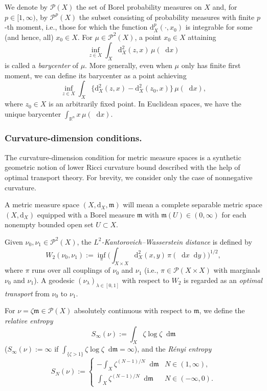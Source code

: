 \documentclass[sts]{imsart}
\theoremstyle{definition}
\theoremstyle{remark}
\newcommand{\R}{\mathbb{R}}
\newcommand{\fm}{\mathfrak{m}}
\newcommand{\dist}{\mathrm{d}}
\newcommand*\diff{\mathop{}\!\mathrm{d}}
\begin{document}
We denote by $\mathcal{P}(X)$ the set of Borel probability measures on $X$ and, for $p \in [1,\infty)$, by $\mathcal{P}^p(X)$ the subset consisting of probability measures with finite $p$-th moment, i.e., those for which the function $\dist_X^p(\cdot,x_0)$ is integrable for some (and hence, all) $x_0\in X$.
For $\mu\in \mathcal P^2(X)$, a point $x_0 \in X$ attaining
\[
\inf_{z \in X} \int_X \dist_X^2(z,x) \,\mu(\diff x)
\]
is called a \emph{barycenter} of $\mu$.
More generally, even when $\mu$ only has finite first moment, we can define its barycenter as a point achieving
\[
\inf_{z \in X} \int_X \bigl\{ \dist_X^2(z,x) -\dist_X^2(z_0,x) \bigr\} \,\mu(\diff x),
\]
where $z_0 \in X$ is an arbitrarily fixed point.
In Euclidean spaces, we have the unique barycenter $\int_{\R^n} x \,\mu(\diff x)$.

\subsubsection{Curvature-dimension conditions.}%

The curvature-dimension condition for metric measure spaces is a synthetic geometric notion of lower Ricci curvature bound described with the help of optimal transport theory.
For brevity, we consider only the case of nonnegative curvature.

A metric measure space $(X,\dist_X,\fm)$ will mean a complete separable metric space $(X,\dist_X)$ equipped with a Borel measure $\fm$ with $\fm(U) \in (0,\infty)$ for each nonempty bounded open set $U \subset X$.

Given $\nu_0,\nu_1 \in \mathcal{P}^2(X)$, the \emph{$L^2$-Kantorovich--Wasserstein distance} is defined by
\[
W_2(\nu_0,\nu_1) :=\inf_{\pi} \biggl( \int_{X \times X} \dist_X^2(x,y) \,\pi(\diff x \diff y) \biggr)^{1/2},
\]
where $\pi$ runs over all couplings of $\nu_0$ and $\nu_1$
(i.e., $\pi \in \mathcal{P}(X \times X)$ with marginals $\nu_0$ and $\nu_1$).
A geodesic $(\nu_{\lambda})_{\lambda \in [0,1]}$ with respect to $W_2$ is regarded as an \emph{optimal transport} from $\nu_0$ to $\nu_1$.

For $\nu =\zeta \fm \in \mathcal{P}(X)$ absolutely continuous with respect to $\fm$, we define the \emph{relative entropy}
\[
S_{\infty}(\nu) :=\int_X \zeta \log\zeta \diff\fm
\]
($S_\infty(\nu):=\infty$ if $\int_{\{\zeta>1\}} \zeta\log\zeta \diff\fm =\infty$),
and the \emph{R\'enyi entropy}
\[
S_N(\nu) :=\begin{cases}
-\int_X \zeta^{(N-1)/N} \diff\fm & N \in (1,\infty), \\
\int_X \zeta^{(N-1)/N} \diff\fm & N \in (-\infty,0).
\end{cases}
\]
\end{document}
